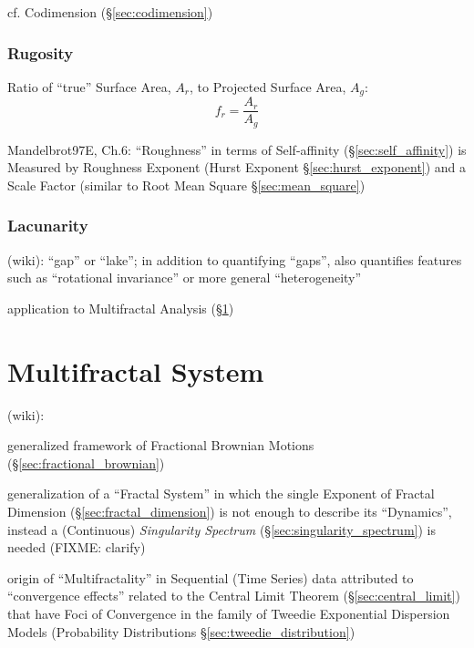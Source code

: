 cf. Codimension (\S\ref{sec:codimension})



\subsubsection{Rugosity}\label{sec:rugosity}


Ratio of ``true'' Surface Area, $A_r$, to Projected Surface Area, $A_g$:
\[
  f_r = \frac{A_r}{A_g}
\]

Mandelbrot97E, Ch.6: ``Roughness'' in terms of Self-affinity
(\S\ref{sec:self_affinity}) is Measured by Roughness Exponent (Hurst Exponent
\S\ref{sec:hurst_exponent}) and a Scale Factor (similar to Root Mean Square
\S\ref{sec:mean_square})



\subsubsection{Lacunarity}\label{sec:lacunarity}


(wiki): ``gap'' or ``lake''; in addition to quantifying ``gaps'', also
quantifies features such as ``rotational invariance'' or more general
``heterogeneity''

application to Multifractal Analysis (\S\ref{sec:multifractal_system})



\section{Multifractal System}\label{sec:multifractal_system}

(wiki):

generalized framework of Fractional Brownian Motions
(\S\ref{sec:fractional_brownian})

generalization of a ``Fractal System'' in which the single Exponent of Fractal
Dimension (\S\ref{sec:fractal_dimension}) is not enough to describe its
``Dynamics'',  instead a (Continuous) \emph{Singularity Spectrum}
(\S\ref{sec:singularity_spectrum}) is needed (FIXME: clarify)

origin of ``Multifractality'' in Sequential (Time Series) data attributed to
``convergence effects'' related to the Central Limit Theorem
(\S\ref{sec:central_limit}) that have Foci of Convergence in the family of
Tweedie Exponential Dispersion Models (Probability Distributions
\S\ref{sec:tweedie_distribution})

